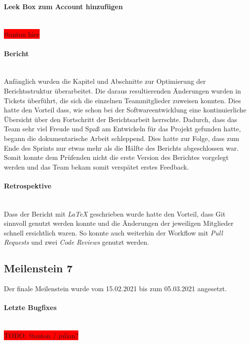 \documentclass[10pt, a4paper]{article}
\begin{document}
\begin{onehalfspace}
\paragraph*{Leek Box zum Account hinzufügen} $~$ \\
\colorbox{red}{@anton hier}


\paragraph*{Bericht} $~$ \\
Anfänglich wurden die Kapitel und Abschnitte zur Optimierung der Berichtsstruktur überarbeitet.
Die daraus resultierenden Änderungen wurden in Tickets überführt, die sich die einzelnen Teammitglieder zuweisen konnten.
Dies hatte den Vorteil dass, wie schon bei der Softwareentwicklung eine kontinuierliche Übersicht über den Fortschritt der Berichtsarbeit herrschte.
Dadurch, dass das Team sehr viel Freude und Spaß am Entwickeln für das Projekt gefunden hatte, begann die dokumentarische Arbeit schleppend.
Dies hatte zur Folge, dass zum Ende des Sprints nur etwas mehr als die Hälfte des Berichts abgeschlossen war. Somit konnte dem Prüfenden nicht die erste Version des Berichtes vorgelegt werden und das Team bekam somit verspätet erstes Feedback.

\paragraph*{Retrospektive} $~$ \\
Dass der Bericht mit \textit{LaTeX} geschrieben wurde hatte den Vorteil, dass Git sinnvoll genutzt werden konnte und die Änderungen der jeweiligen Mitglieder schnell ersichtlich waren.
So konnte auch weiterhin der Workflow mit \textit{Pull Requests} und zwei \textit{Code Reviews} genutzt werden.

\subsection{Meilenstein 7}
Der finale Meilenstein wurde vom 15.02.2021 bis zum 05.03.2021 angesetzt.

\paragraph*{Letzte Bugfixes} $~$ \\
\colorbox{red}{TODO: @anton / julian?}


\end{onehalfspace}
\end{document}
